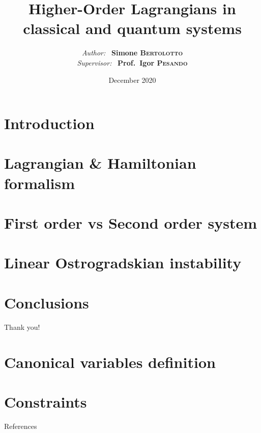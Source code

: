 \documentclass[10pt]{beamer}
\title{Higher-Order Lagrangians in classical and quantum systems}
\date{December 2020}
\author{
  \textit{Author:} \ \textbf{Simone \textsc{Bertolotto}} \\
  \textit{Supervisor:} \ \textbf{Prof.\ Igor \textsc{Pesando}} \vspace{1em}
}
\institute{
  \textsc{Università degli studi di Torino --- Dipartimento di Fisica}
}
\begin{document}
  \maketitle

  \section{Introduction}
  

  \section{Lagrangian \& Hamiltonian formalism}
  

  \section{First order vs Second order system}
  

  \section{Linear Ostrogradskian instability}
  

  \section{Conclusions}
  

  \begin{frame}[standout]
    Thank you!
  \end{frame}

  \appendix

  \section{Canonical variables definition}
  

  \section{Constraints}
  

  \begin{frame}[allowframebreaks]{References}
    
    
  \end{frame}
\end{document}
